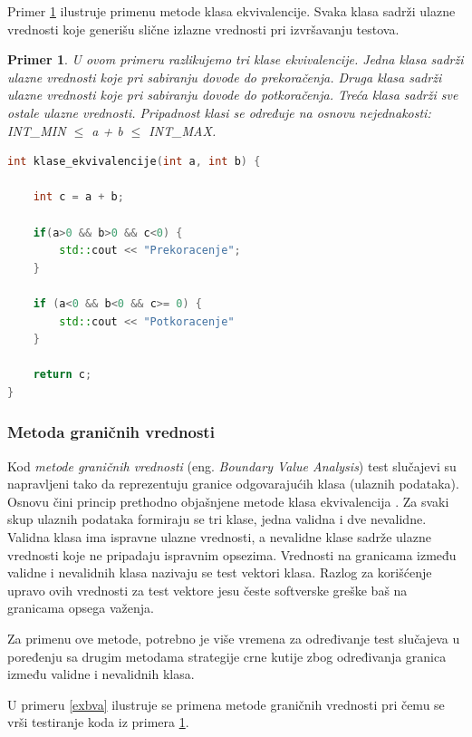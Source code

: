 \documentclass[12pt,oneside]{memoir}
\newtheorem{primer}{Primer}
\begin{document}
Primer \ref{exeq} ilustruje primenu metode klasa ekvivalencije.
Svaka klasa sadrži ulazne vrednosti koje generišu slične izlazne vrednosti pri izvršavanju testova.

\begin{primer} \label{exeq}U ovom primeru razlikujemo tri klase ekvivalencije. Jedna klasa sadrži ulazne vrednosti koje pri sabiranju dovode do prekoračenja. Druga klasa sadrži ulazne vrednosti koje pri sabiranju dovode do potkoračenja. Treća klasa sadrži sve ostale ulazne vrednosti. 
Pripadnost klasi se određuje na osnovu nejednakosti:
INT\_MIN $\leq$ a + b $\leq$ INT\_MAX.
\begin{lstlisting}[language=C++]
int klase_ekvivalencije(int a, int b) {
	
    int c = a + b;
    
    if(a>0 && b>0 && c<0) {
        std::cout << "Prekoracenje";
    } 
    
    if (a<0 && b<0 && c>= 0) {
        std::cout << "Potkoracenje"
    } 
    	
    return c;
}

\end{lstlisting}
\end{primer}

\subsubsection{Metoda graničnih vrednosti}
Kod \emph{metode graničnih  vrednosti} (eng. \textit{Boundary Value  Analysis}) test slučajevi su
napravljeni  tako  da  reprezentuju  granice  odgovarajućih 
klasa (ulaznih podataka). Osnovu čini princip prethodno objašnjene 
metode klasa ekvivalencija \cite{PartitioningBoundary}.
Za svaki skup ulaznih podataka formiraju se tri klase, jedna validna i dve nevalidne. Validna klasa ima ispravne ulazne vrednosti, a nevalidne klase sadrže ulazne vrednosti koje ne pripadaju ispravnim opsezima. Vrednosti na granicama između validne i nevalidnih klasa nazivaju se test vektori klasa.
Razlog  za korišćenje upravo ovih vrednosti za test vektore jesu česte softverske greške baš na
granicama opsega važenja. 

Za primenu ove metode, potrebno je više vremena za određivanje test slučajeva u poređenju sa drugim metodama strategije crne kutije zbog određivanja granica između validne i nevalidnih klasa.
 
U primeru \ref{exbva} ilustruje se primena metode graničnih vrednosti pri čemu se vrši testiranje koda iz primera \ref{exeq}.
\end{document}
